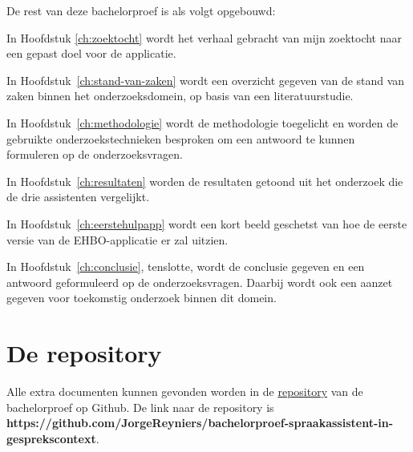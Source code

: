 De rest van deze bachelorproef is als volgt opgebouwd:

In Hoofdstuk \ref{ch:zoektocht} wordt het verhaal gebracht van mijn zoektocht naar een gepast doel voor de applicatie.

In Hoofdstuk~\ref{ch:stand-van-zaken} wordt een overzicht gegeven van de stand van zaken binnen het onderzoeksdomein, op basis van een literatuurstudie.

In Hoofdstuk~\ref{ch:methodologie} wordt de methodologie toegelicht en worden de gebruikte onderzoekstechnieken besproken om een antwoord te kunnen formuleren op de onderzoeksvragen.

In Hoofdstuk~\ref{ch:resultaten} worden de resultaten getoond uit het onderzoek die de drie assistenten vergelijkt.

In Hoofdstuk~\ref{ch:eerstehulpapp} wordt een kort beeld geschetst van hoe de eerste versie van de EHBO-applicatie er zal uitzien.

In Hoofdstuk~\ref{ch:conclusie}, tenslotte, wordt de conclusie gegeven en een antwoord geformuleerd op de onderzoeksvragen. Daarbij wordt ook een aanzet gegeven voor toekomstig onderzoek binnen dit domein.

\section{De repository}
\label{s:verwijzing naar repository}
Alle extra documenten kunnen gevonden worden in de \href{https://github.com/JorgeReyniers/bachelorproef-spraakassistent-in-gesprekscontext}{repository} van de bachelorproef op Github.
De link naar de repository is \textbf{https://github.com/JorgeReyniers/bachelorproef-spraakassistent-in-gesprekscontext}.


